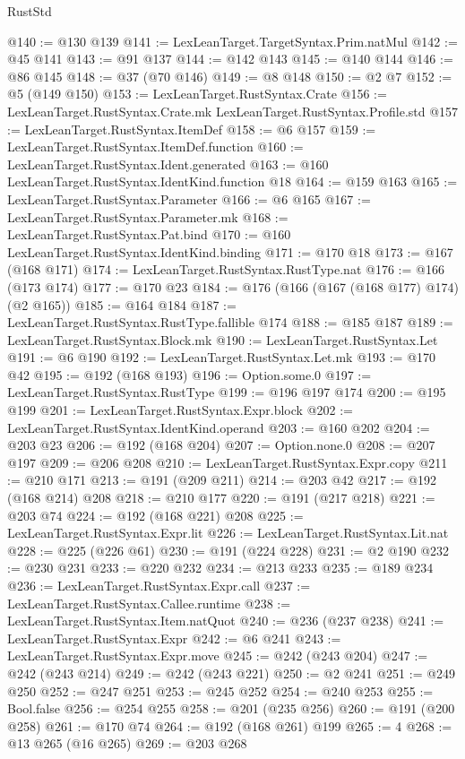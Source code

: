 \begin{lexlean}{RustStd}
\begin{coremodule}
@140 := @130 @139
@141 := LexLeanTarget.TargetSyntax.Prim.natMul
@142 := @45 @141
@143 := @91 @137
@144 := @142 @143
@145 := @140 @144
@146 := @86 @145
@148 := @37 (@70 @146)
@149 := @8 @148
@150 := @2 @7
@152 := @5 (@149 @150)
@153 := LexLeanTarget.RustSyntax.Crate
@156 := LexLeanTarget.RustSyntax.Crate.mk LexLeanTarget.RustSyntax.Profile.std
@157 := LexLeanTarget.RustSyntax.ItemDef
@158 := @6 @157
@159 := LexLeanTarget.RustSyntax.ItemDef.function
@160 := LexLeanTarget.RustSyntax.Ident.generated
@163 := @160 LexLeanTarget.RustSyntax.IdentKind.function @18
@164 := @159 @163
@165 := LexLeanTarget.RustSyntax.Parameter
@166 := @6 @165
@167 := LexLeanTarget.RustSyntax.Parameter.mk
@168 := LexLeanTarget.RustSyntax.Pat.bind
@170 := @160 LexLeanTarget.RustSyntax.IdentKind.binding
@171 := @170 @18
@173 := @167 (@168 @171)
@174 := LexLeanTarget.RustSyntax.RustType.nat
@176 := @166 (@173 @174)
@177 := @170 @23
@184 := @176 (@166 (@167 (@168 @177) @174) (@2 @165))
@185 := @164 @184
@187 := LexLeanTarget.RustSyntax.RustType.fallible @174
@188 := @185 @187
@189 := LexLeanTarget.RustSyntax.Block.mk
@190 := LexLeanTarget.RustSyntax.Let
@191 := @6 @190
@192 := LexLeanTarget.RustSyntax.Let.mk
@193 := @170 @42
@195 := @192 (@168 @193)
@196 := Option.some.{0}
@197 := LexLeanTarget.RustSyntax.RustType
@199 := @196 @197 @174
@200 := @195 @199
@201 := LexLeanTarget.RustSyntax.Expr.block
@202 := LexLeanTarget.RustSyntax.IdentKind.operand
@203 := @160 @202
@204 := @203 @23
@206 := @192 (@168 @204)
@207 := Option.none.{0}
@208 := @207 @197
@209 := @206 @208
@210 := LexLeanTarget.RustSyntax.Expr.copy
@211 := @210 @171
@213 := @191 (@209 @211)
@214 := @203 @42
@217 := @192 (@168 @214) @208
@218 := @210 @177
@220 := @191 (@217 @218)
@221 := @203 @74
@224 := @192 (@168 @221) @208
@225 := LexLeanTarget.RustSyntax.Expr.lit
@226 := LexLeanTarget.RustSyntax.Lit.nat
@228 := @225 (@226 @61)
@230 := @191 (@224 @228)
@231 := @2 @190
@232 := @230 @231
@233 := @220 @232
@234 := @213 @233
@235 := @189 @234
@236 := LexLeanTarget.RustSyntax.Expr.call
@237 := LexLeanTarget.RustSyntax.Callee.runtime
@238 := LexLeanTarget.RustSyntax.Item.natQuot
@240 := @236 (@237 @238)
@241 := LexLeanTarget.RustSyntax.Expr
@242 := @6 @241
@243 := LexLeanTarget.RustSyntax.Expr.move
@245 := @242 (@243 @204)
@247 := @242 (@243 @214)
@249 := @242 (@243 @221)
@250 := @2 @241
@251 := @249 @250
@252 := @247 @251
@253 := @245 @252
@254 := @240 @253
@255 := Bool.false
@256 := @254 @255
@258 := @201 (@235 @256)
@260 := @191 (@200 @258)
@261 := @170 @74
@264 := @192 (@168 @261) @199
@265 := 4
@268 := @13 @265 (@16 @265)
@269 := @203 @268

\end{coremodule}
\end{lexlean}
